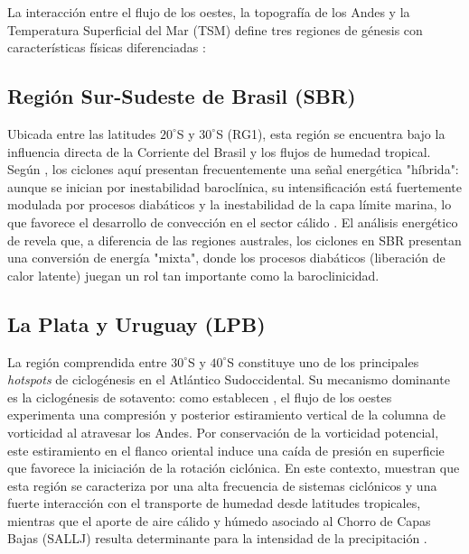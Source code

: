 La interacción entre el flujo de los oestes, la topografía de los Andes y la Temperatura Superficial del Mar (TSM) define tres regiones de génesis con características físicas diferenciadas \citep{gramcianinov2019properties}:

\subsection{Región Sur-Sudeste de Brasil (SBR)}\label{subsec:mt_sbr}
Ubicada entre las latitudes $20^\circ$S y $30^\circ$S (RG1), esta región se encuentra bajo la influencia directa de la Corriente del Brasil y los flujos de humedad tropical. Según \citet{reboita2022from}, los ciclones aquí presentan frecuentemente una señal energética "híbrida": aunque se inician por inestabilidad baroclínica, su intensificación está fuertemente modulada por procesos diabáticos y la inestabilidad de la capa límite marina, lo que favorece el desarrollo de convección en el sector cálido \citep{marrafon2022classificacao}. El análisis energético de \citet{coutodesouza2024thesis} revela que, a diferencia de las regiones australes, los ciclones en SBR presentan una conversión de energía "mixta", donde los procesos diabáticos (liberación de calor latente) juegan un rol tan importante como la baroclinicidad.

\subsection{La Plata y Uruguay (LPB)}\label{subsec:mt_lpb}
La región comprendida entre $30^\circ$S y $40^\circ$S constituye uno de los principales \textit{hotspots} de ciclogénesis en el Atlántico Sudoccidental. Su mecanismo dominante es la ciclogénesis de sotavento: como establecen \citet{gan1994influence}, el flujo de los oestes experimenta una compresión y posterior estiramiento vertical de la columna de vorticidad al atravesar los Andes. Por conservación de la vorticidad potencial, este estiramiento en el flanco oriental induce una caída de presión en superficie que favorece la iniciación de la rotación ciclónica. En este contexto, \citet{reboita2010south} muestran que esta región se caracteriza por una alta frecuencia de sistemas ciclónicos y una fuerte interacción con el transporte de humedad desde latitudes tropicales, mientras que el aporte de aire cálido y húmedo asociado al Chorro de Capas Bajas (SALLJ) resulta determinante para la intensidad de la precipitación \citep{crespo2020potential}.



